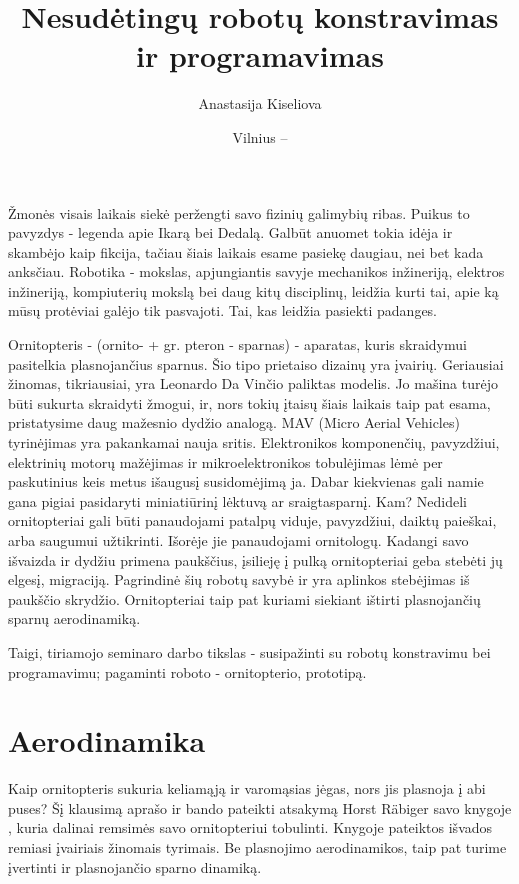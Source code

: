 \documentclass{VUMIFPSkursinis}
\title{Nesudėtingų robotų konstravimas ir programavimas}
\author{Anastasija Kiseliova}
\date{Vilnius – \the\year}
\begin{document}
\maketitle
\tableofcontents

Žmonės visais laikais siekė peržengti savo fizinių galimybių ribas. Puikus to pavyzdys - legenda apie Ikarą bei Dedalą. Galbūt anuomet tokia idėja ir skambėjo kaip fikcija, tačiau šiais laikais esame pasiekę daugiau, nei bet kada anksčiau. Robotika - mokslas, apjungiantis savyje mechanikos inžineriją, elektros inžineriją, kompiuterių mokslą bei daug kitų disciplinų, leidžia kurti tai, apie ką mūsų protėviai galėjo tik pasvajoti. Tai, kas leidžia pasiekti padanges.\par
Ornitopteris - (ornito- + gr. pteron - sparnas) - aparatas, kuris skraidymui pasitelkia plasnojančius sparnus. Šio tipo prietaiso dizainų yra įvairių. Geriausiai žinomas, tikriausiai, yra Leonardo Da Vinčio paliktas modelis. Jo mašina turėjo būti sukurta skraidyti žmogui, ir, nors tokių įtaisų šiais laikais taip pat esama, pristatysime daug mažesnio dydžio analogą. MAV (Micro Aerial Vehicles) tyrinėjimas yra pakankamai nauja sritis. Elektronikos komponenčių, pavyzdžiui, elektrinių motorų mažėjimas ir mikroelektronikos tobulėjimas lėmė per paskutinius keis metus išaugusį susidomėjimą ja. Dabar kiekvienas gali namie gana pigiai pasidaryti miniatiūrinį lėktuvą ar sraigtasparnį. Kam? Nedideli ornitopteriai gali būti panaudojami patalpų viduje, pavyzdžiui, daiktų paieškai, arba saugumui užtikrinti. Išorėje jie panaudojami ornitologų. Kadangi savo išvaizda ir dydžiu primena paukščius, įsilieję į pulką ornitopteriai geba stebėti jų elgesį, migraciją. Pagrindinė šių robotų savybė ir yra aplinkos stebėjimas iš paukščio skrydžio. Ornitopteriai taip pat kuriami siekiant ištirti plasnojančių sparnų aerodinamiką. \par
Taigi, tiriamojo seminaro darbo tikslas - susipažinti su robotų konstravimu bei programavimu; pagaminti roboto - ornitopterio, prototipą. 

\section{Aerodinamika}
Kaip ornitopteris sukuria keliamąją ir varomąsias jėgas, nors jis plasnoja į abi puses? Šį klausimą aprašo ir bando pateikti atsakymą Horst Räbiger savo knygoje \cite{2}, kuria dalinai remsimės savo ornitopteriui tobulinti. Knygoje pateiktos išvados remiasi įvairiais žinomais tyrimais. Be plasnojimo aerodinamikos, taip pat turime įvertinti ir plasnojančio sparno dinamiką.
\end{document}
